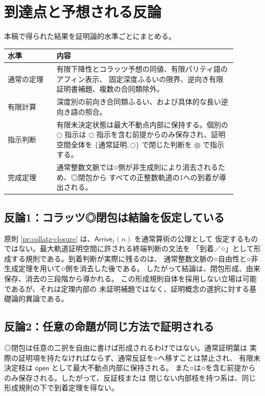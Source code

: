\documentclass[a4paper,11pt]{ltjsarticle}
\theoremstyle{definition}
\theoremstyle{plain}
\newcommand{\dfix}{\mathord{\text{○}}}
\newcommand{\udfix}{\mathord{\text{◎}}}
\newcommand{\Arr}{\mathsf{Arrive}_{1}}
\newcommand{\1}{\mathbf{1}}
\begin{document}
\section{到達点と予想される反論}

本稿で得られた結果を証明論的水準ごとにまとめる。

\begin{center}
\begin{tabular}{p{0.19\linewidth}p{0.70\linewidth}}
\toprule
水準 & 内容\\
\midrule
通常の定理
& 有限下降性とコラッツ予想の同値、有限パリティ語のアフィン表示、
固定深度ふるいの限界、逆向き有限証明書補題、複数の合同類除外。\\
有限計算
& 深度別の前向き合同類ふるい、および具体的な長い逆向き語の照合。\\
指示判断
& 有限未決定状態は最大不動点内部に保持する。個別の $\dfix$ 指示は
$\dfix$ 指示を含む前提からのみ保存され、証明空間全体を
$\{\text{通常証明},\dfix\}$ で閉じた判断を $\udfix$ で指示する。\\
完成定理
& 通常整数文脈では○側が非生成則により消去されるため、◎閉包から
すべての正整数軌道の1への到着が導出される。\\
\bottomrule
\end{tabular}
\end{center}

\subsection{反論1：コラッツ◎閉包は結論を仮定している}

原則 \ref{pr:collatz-closure} は、$\Arr(n)$ を通常算術の公理として
仮定するものではない。最大軌道証明空間に許される終端判断の文法を
「到着／○」として形成する規則である。到着判断が実際に残るのは、
通常整数文脈の○自由性と○非生成定理を用いて○側を消去した後である。
したがって結論は、閉包形成、由来保存、消去の三段階から導かれる。
この形成規則自体を採用しない立場は可能であるが、それは定理内部の
未証明補題ではなく、証明概念の選択に対する基礎論的異論である。

\subsection{反論2：任意の命題が同じ方法で証明される}

◎閉包は任意の二択を自由に書けば形成されるわけではない。通常証明葉は
実際の証明項を持たなければならず、通常反証を○へ移すことは禁止され、
有限未決定枝は $\mathsf{open}$ として最大不動点内部に保持される。
また○は○を含む前提からのみ保存される。したがって、反証枝または
閉じない内部枝を持つ系は、同じ形成規則の下で到着定理を得ない。
\end{document}
